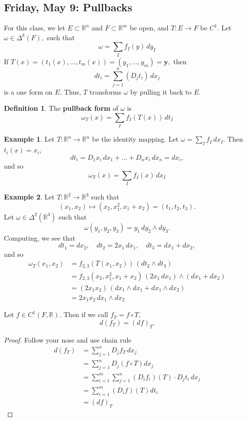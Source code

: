\documentclass[10pt, oneside]{article}
\newcommand{\bbR}{\mathbb{R}}
\theoremstyle{definition}
\newtheorem{exmp}{Example}[section]
\newtheorem{defn}{Definition}
\begin{document}
\subsection{Friday, May 9:  Pullbacks}
For this class, we let $E\subset \bbR^n$ and $F\subset\bbR^m$ be open, and $T: E\to F$ be $C^1.$ Let $\omega \in \Delta^k(F),$ such that 
\[\omega = \sum_{I}f_I(y) \,dy_I\] If $T(x) = (t_1(x), \dots, t_m(x)) = (y_1, \dots, y_m) = \textbf{y},$ then 
\[dt_i = \sum_{j=1}^n(D_j t_i)\, dx_j\] is a one form on $E.$ Thus, $T$ transforms $\omega$ by pulling it back to $E.$ 
\begin{defn}
    The \textbf{pullback form} of $\omega$ is 
    \[\omega_T(x) = \sum_{I}f_I(T(x))\,dt_{I}\]
\end{defn}
\begin{exmp}
    Let $T: \bbR^n \to \bbR^n$ be the identity mapping. Let $\omega = \sum_I f_I \,dx_I$. Then $t_i(x) = x_i,$ 
    \[dt_i = D_1 x_i \,dx_1 + \dots + D_n x_i \, dx_n =   dx_i,\] and so 
    \[\omega_T(x) = \sum_I f_I(x)\, dx_I\]
\end{exmp}
\begin{exmp}
    Let $T: \bbR^2 \to \bbR^3$ such that 
    \[(x_1, x_2)\mapsto (x_2, x_1^2, x_1 + x_2) = (t_1, t_2, t_3).\] Let $\omega \in \Delta^2(\bbR^3)$ such that 
    \[\omega(y_1, y_2, y_3) = y_1\,dy_2 \wedge dy_3.\] Computing, we see that 
    \[dt_1 = dx_2, \quad dt_2 = 2x_1\,dx_1, \quad dt_3 = dx_1 + dx_2,\] and so 
    \begin{align*}
        \omega_T(x_1, x_2) &= f_{2,3}(T(x_1, x_2)) \,(dt_2 \wedge dt_3)\\
        &= f_{2,3}(x_2, x_1^2, x_1 + x_2) \,(2x_1\,dx_1) \wedge (dx_1 + dx_2)\\
        &= (2x_1x_2)\,(dx_1 \wedge dx_1 + dx_1 \wedge dx_2)\\
        &= 2x_1x_2\, dx_1 \wedge dx_2
    \end{align*}
\end{exmp}
\begin{lemma}
    Let $f\in C^1(F, \bbR).$ Then if we call $f_T = f\circ T,$ 
    \[d(f_T) = (df)_T.\]
\end{lemma}
\begin{proof}
    Follow your nose and use chain rule
    \begin{align*}
        d(f_T) &= \sum_{j=1}^n D_j f_T\,dx_j\\
        &= \sum_{j=1}^n D_j (f\circ T)dx_j\\
        &= \sum_{i=1}^m \sum_{j=1}^n (D_if_i)(T)\cdot D_jt_i\,dx_j\\
        &= \sum_{i=1}^m (D_if)(T)dt_i\\
        &= (df)_T
    \end{align*}
\end{proof}
\end{document}
